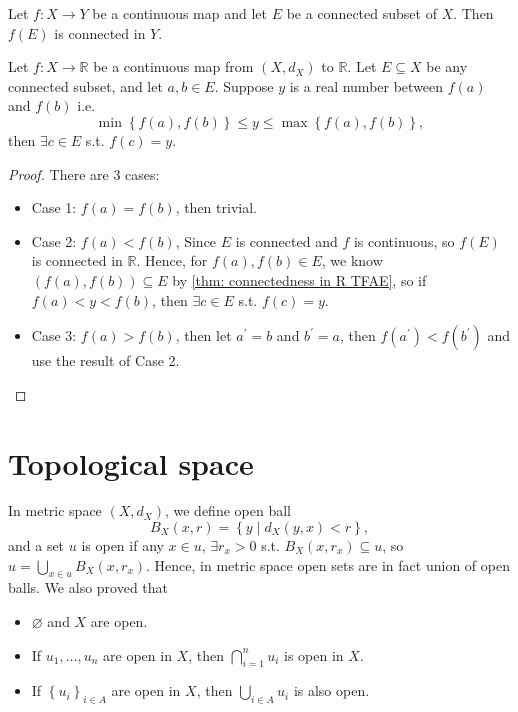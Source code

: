 \begin{theorem}
    Let \(f: X \to Y\) be a continuous map and let \(E\) be a connected subset of \(X\). Then \(f(E)\) is connected in \(Y\).     
\end{theorem}
\begin{corollary} \label{cl: Intermediate value theorem}
    Let \(f: X \to \mathbb{R} \) be a continuous map from \((X, d_X)\) to \(\mathbb{R} \). Let \(E \subseteq X\) be any connected subset, and let \(a, b \in E\). Suppose \(y\) is a real number between \(f(a)\) and \(f(b)\) i.e. 
    \[
        \min \left\{ f(a), f(b) \right\} \le y \le \max \left\{ f(a), f(b) \right\},  
    \] then \(\exists c \in E\) s.t. \(f(c) = y\).  
\end{corollary}
\begin{proof}
    There are \(3\) cases: 
    \begin{itemize}
        \item Case 1: \(f(a) = f(b)\), then trivial. 
        \item Case 2: \(f(a) < f(b)\), Since \(E\) is connected and \(f\) is continuous, so \(f(E)\) is connected in \(\mathbb{R} \). Hence, for \(f(a), f(b) \in E\), we know \(\left( f(a), f(b) \right) \subseteq E \) by \autoref{thm: connectedness in R TFAE}, so if \(f(a) < y < f(b)\), then \(\exists c \in E\) s.t. \(f(c) = y\).           
        \item Case 3: \(f(a) > f(b)\), then let \(a^{\prime} = b\) and \(b^{\prime} = a\), then \(f \left( a^{\prime}  \right) < f \left( b^{\prime}  \right)  \) and use the result of Case 2.
    \end{itemize} 
\end{proof}
\section{Topological space}
In metric space \((X, d_X)\), we define open ball
\[
    B_X(x, r) = \left\{ y \mid d_X (y, x) < r \right\},
\]
and a set \(u\) is open if any \(x \in u\), \(\exists r_x > 0\) s.t. \(B_X(x, r_x) \subseteq u\), so \(u = \bigcup_{x \in u} B_X(x, r_x) \). Hence, in metric space open sets are in fact union of open balls. We also proved that 
\begin{itemize}
    \item \(\varnothing  \) and \(X\) are open. 
    \item  If \(u_1, \dots , u_n\) are open in \(X\), then \(\bigcap_{i=1}^{n} u_i \) is open in \(X\). 
    \item If \(\left\{ u_i \right\}_{i \in A} \) are open in \(X\), then \(\bigcup_{i \in A} u_{i} \) is also open.       
\end{itemize}    

